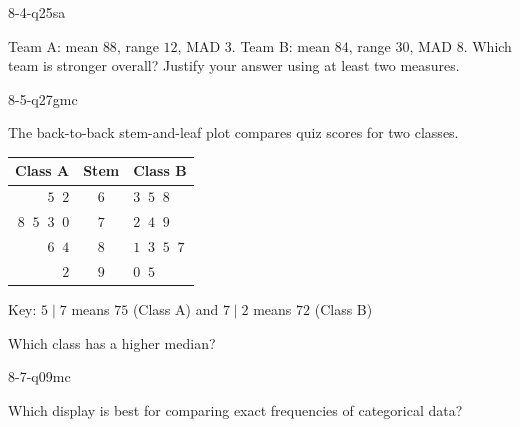 \begin{practiceQuestion}{8-4-q25}{sa}
\begin{questionText}
Team A: mean $88$, range $12$, MAD $3$. Team B: mean $84$, range $30$, MAD $8$. Which team is stronger overall? Justify your answer using at least two measures.
\end{questionText}
\end{practiceQuestion}

\begin{practiceQuestion}{8-5-q27}{gmc}
\begin{questionText}
The back-to-back stem-and-leaf plot compares quiz scores for two classes.

\begin{center}
\begin{tabular}{r|c|l}
\textbf{Class A} & \textbf{Stem} & \textbf{Class B} \\
\hline
$5\;\;2$ & $6$ & $3\;\;5\;\;8$ \\
$8\;\;5\;\;3\;\;0$ & $7$ & $2\;\;4\;\;9$ \\
$6\;\;4$ & $8$ & $1\;\;3\;\;5\;\;7$ \\
$2$ & $9$ & $0\;\;5$
\end{tabular}

Key: $5 \mid 7$ means $75$ (Class A) and $7 \mid 2$ means $72$ (Class B)
\end{center}

Which class has a higher median?
\end{questionText}
\end{practiceQuestion}

\begin{practiceQuestion}{8-7-q09}{mc}
\begin{questionText}
Which display is best for comparing exact frequencies of categorical data?
\end{questionText}
\end{practiceQuestion}

